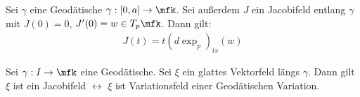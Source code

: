 \begin{lem}
    Sei $\gamma$ eine Geodätische $\gamma : [0,a]\to\mfk$.
    Sei außerdem $J$ ein Jacobifeld entlang $\gamma$ mit 
    $J(0)=0$, $J'(0)=w \in T_p\mfk$.
    Dann gilt:
    \begin{align*}
        J(t) = t (d \exp_p)_{tv} (w)
    \end{align*}
\end{lem}

\begin{satz}
    Sei $\gamma : I \to \mfk$ eine Geodätische.
    Sei $\xi$ ein glattes Vektorfeld längs $\gamma$.
    Dann gilt\\
    $\xi$ ist ein Jacobifeld $\leftrightarrow$ $\xi$ ist Variationsfeld einer Geodätischen Variation.
\end{satz}









